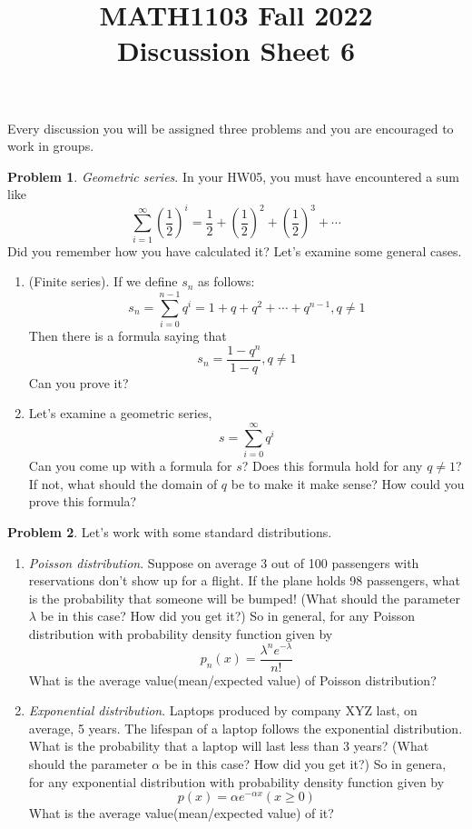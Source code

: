 \documentclass[11pt,oneside]{amsart}
\title{MATH1103 Fall 2022\\
Discussion Sheet 6}
\theoremstyle{definition}
\newtheorem{problem}{Problem}
\begin{document}
    \maketitle
    Every discussion you will be assigned three problems and you are encouraged to work in groups.

    \begin{problem}\textit{Geometric series}. In your HW05, you must have encountered a sum like
    $$
    \sum_{i=1}^\infty (\frac{1}{2})^i=\frac{1}{2}+(\frac{1}{2})^2+(\frac{1}{2})^3+\cdots
    $$
    Did you remember how you have calculated it? Let's examine some general cases.
        \begin{enumerate}
         \item (Finite series). If we define $s_n$ as follows:
         $$
         s_n=\sum_{i=0}^{n-1} q^i=1+q+q^2+\cdots+q^{n-1}, q \not = 1
         $$
         Then there is a formula saying that 
         $$
         s_n=\frac{1-q^n}{1-q},q \not = 1
         $$
         Can you prove it?
         \item Let's examine a geometric series,
         $$
         s=\sum_{i=0}^\infty q^i
         $$
         Can you come up with a formula for $s$? Does this formula hold for any $q \not=1$? If not, what should the domain of $q$ be to make it make sense? How could you prove this formula?
         \end{enumerate}
    \end{problem}

    \begin{problem} Let's work with some standard distributions.
    \begin{enumerate}
        \item \textit{Poisson distribution}. Suppose on average 3 out of 100 passengers with reservations don't show up for a flight. If the plane holds 98 passengers, what is the probability that someone will be bumped! (What should the parameter $\lambda$ be in this case? How did you get it?) So in general, for any Poisson distribution with probability density function given by 
        $$
        p_n(x)=\frac{\lambda^n e^{-\lambda}}{n!}
        $$
        What is the average value(mean/expected value) of Poisson distribution?
        \item \textit{Exponential distribution}. Laptops produced by company XYZ last, on average, 5 years. The lifespan of a laptop follows the exponential distribution. What is the probability that a laptop will last less than 3 years? (What should the parameter $\alpha$ be in this case? How did you get it?) So in genera, for any exponential distribution with probability density function given by
        $$
        p(x)=\alpha e^{-\alpha x}(x \geq 0)
        $$
        What is the average value(mean/expected value) of it?
    \end{enumerate}
    \end{problem}
\end{document}
